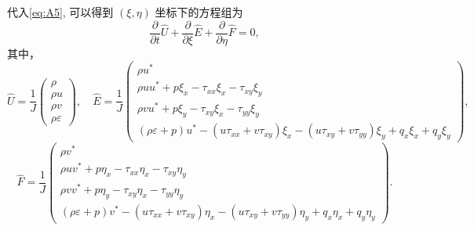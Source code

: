 \documentclass[12pt]{article}
\begin{document}
代入\cref{eq:A5}, 可以得到 $(\xi, \eta)$ 坐标下的方程组为
\begin{equation}
	\frac{\partial}{\partial t} \hat{U}+\frac{\partial}{\partial \xi} \hat{E}+\frac{\partial}{\partial \eta} \hat{F}=0,
	\label{eq:A6}
\end{equation}
其中，
\begin{equation}
	\hat{U}=\frac{1}{J}
	\begin{pmatrix}
		\rho   \\
		\rho u \\
		\rho v \\
		\rho \varepsilon
	\end{pmatrix},\quad
	\hat{E}=\frac{1}{J}\begin{pmatrix}
		\rho u^{*}                                                   \\
		\rho u u^{*}+p \xi_{x}-\tau_{x x} \xi_{x}-\tau_{x y} \xi_{y} \\
		\rho v u^{*}+p \xi_{y}-\tau_{x y} \xi_{x}-\tau_{y y} \xi_{y} \\
		(\rho \varepsilon+p) u^{*}-\left(u \tau_{x x}+v \tau_{x y}\right) \xi_{x}-\left(u \tau_{x y}+v \tau_{y y}\right) \xi_{y}+q_{x} \xi_{x}+q_{y} \xi_{y}
	\end{pmatrix},
\end{equation}
\begin{equation}
	\hat{F}=\frac{1}{J}\begin{pmatrix}
		\rho v^{*}                                                      \\
		\rho u v^{*}+p \eta_{x}-\tau_{x x} \eta_{x}-\tau_{x y} \eta_{y} \\
		\rho v v^{*}+p \eta_{y}-\tau_{x y} \eta_{x}-\tau_{y y} \eta_{y} \\
		(\rho \varepsilon+p) v^{*}-\left(u \tau_{x x}+v \tau_{x y}\right) \eta_{x}-\left(u \tau_{x y}+v \tau_{y y}\right) \eta_{y}+q_{x} \eta_{x}+q_{y} \eta_{y}
	\end{pmatrix}.
\end{equation}
\end{document}

